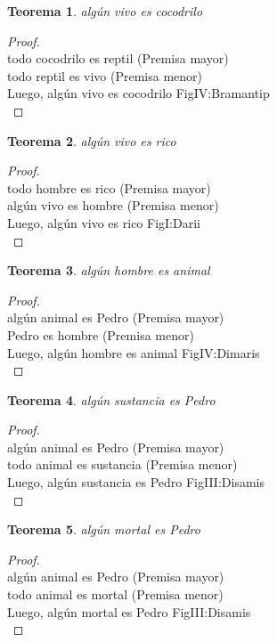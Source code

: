 ﻿\documentclass[12pt]{book}
\newtheorem{theorem}{Teorema}[chapter]
\newtheorem{proof}{Demostración}
\begin{document}
\begin{theorem}
algún vivo es cocodrilo
\label{th: 77}
\end{theorem}\begin{proof}\\todo cocodrilo es reptil	 (Premisa mayor) \\todo reptil es vivo	 (Premisa menor) \\Luego, algún vivo es cocodrilo	FigIV:Bramantip \\ \end{proof}
\begin{theorem}
algún vivo es rico
\label{th: 78}
\end{theorem}\begin{proof}\\todo hombre es rico	 (Premisa mayor) \\algún vivo es hombre	 (Premisa menor) \\Luego, algún vivo es rico	FigI:Darii \\ \end{proof}
\begin{theorem}
algún hombre es animal
\label{th: 79}
\end{theorem}\begin{proof}\\algún animal es Pedro	 (Premisa mayor) \\Pedro es hombre	 (Premisa menor) \\Luego, algún hombre es animal	FigIV:Dimaris \\ \end{proof}
\begin{theorem}
algún sustancia es Pedro
\label{th: 80}
\end{theorem}\begin{proof}\\algún animal es Pedro	 (Premisa mayor) \\todo animal es sustancia	 (Premisa menor) \\Luego, algún sustancia es Pedro	FigIII:Disamis \\ \end{proof}
\begin{theorem}
algún mortal es Pedro
\label{th: 81}
\end{theorem}\begin{proof}\\algún animal es Pedro	 (Premisa mayor) \\todo animal es mortal	 (Premisa menor) \\Luego, algún mortal es Pedro	FigIII:Disamis \\ \end{proof}
\end{document}
